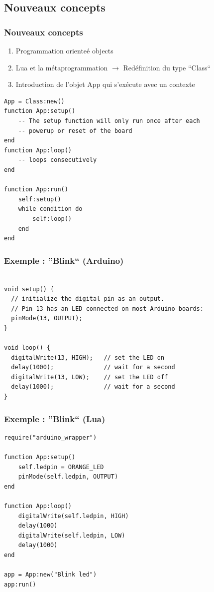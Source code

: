\documentclass{beamer}
\begin{document}
\subsection{Nouveaux concepts}
\begin{frame}[containsverbatim]
\frametitle{Nouveaux concepts}
\begin{enumerate}
 \item Programmation orienteé objects
 \item Lua et la métaprogrammation $\to$ Redéfinition du type ``Class``
 \item Introduction de l'objet App qui s'exécute avec un contexte
\end{enumerate}

\scriptsize{\begin{lstlisting}
App = Class:new()
function App:setup()
    -- The setup function will only run once after each
    -- powerup or reset of the board
end
function App:loop()
    -- loops consecutively
end

function App:run()
    self:setup()
    while condition do
        self:loop()
    end
end
\end{lstlisting}}

\end{frame}

\begin{frame}[containsverbatim]
\frametitle{Exemple : ''Blink`` (Arduino)}
\tiny{\begin{lstlisting}

void setup() {
  // initialize the digital pin as an output.
  // Pin 13 has an LED connected on most Arduino boards:
  pinMode(13, OUTPUT);
}

void loop() {
  digitalWrite(13, HIGH);   // set the LED on
  delay(1000);              // wait for a second
  digitalWrite(13, LOW);    // set the LED off
  delay(1000);              // wait for a second
}
\end{lstlisting}}
\end{frame}

\begin{frame}[containsverbatim]
\frametitle{Exemple : ''Blink`` (Lua)}
\tiny{\begin{lstlisting}
require("arduino_wrapper")

function App:setup()
    self.ledpin = ORANGE_LED
    pinMode(self.ledpin, OUTPUT)
end

function App:loop()
    digitalWrite(self.ledpin, HIGH)
    delay(1000)
    digitalWrite(self.ledpin, LOW)
    delay(1000)
end

app = App:new("Blink led")
app:run()
\end{lstlisting}}
\end{frame}
\end{document}
